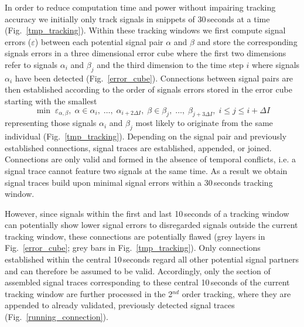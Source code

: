 \documentclass[11pt,pdftex]{article}
\newcommand{\fref}[1]{\textup{\ref{#1}}}
\newcommand{\fig}{Fig.}
\newcommand{\figref}[1]{\fig~\fref{#1}}
\begin{document}
In order to reduce computation time and power without impairing tracking accuracy we initially only track signals in snippets of 30\,seconds at a time (\figref{tmp_tracking}). Within these tracking windows we first compute signal errors ($\varepsilon$) between each potential signal pair $\alpha$ and $\beta$ and store the corresponding signals errors in a three dimensional error cube where the first two dimensions refer to signals $\alpha_i$ and $\beta_j$ and the third dimension to the time step $i$ where signals $\alpha_i$ have been detected (\figref{error_cube}). Connections between signal pairs are then established according to the order of signals errors stored in the error cube starting with the smallest 
\begin{equation}\label{min_e_signal_connect}
  \min \; \varepsilon_{\alpha, \beta}, \; \alpha \in \alpha_i,\;\dots,\;\alpha_{i + 2\Delta I}, \; \beta \in \beta_j,\;\dots,\;\beta_{j + 3\Delta I}, \; i \leq j \leq i + \Delta I  
\end{equation}
representing those signals $\alpha_i$ and $\beta_j$ most likely to originate from the same individual (\figref{tmp_tracking}). Depending on the signal pair and previously established connections, signal traces are established, appended, or joined. Connections are only valid and formed in the absence of temporal conflicts, i.e. a signal trace cannot feature two signals at the same time. As a result we obtain signal traces build upon minimal signal errors within a 30\,seconds tracking window. 

However, since signals within the first and last 10\,seconds of a tracking window can potentially show lower signal errors to disregarded signals outside the current tracking window, these connections are potentially flawed (grey layers in \figref{error_cube}; grey bars in \figref{tmp_tracking}). Only connections established within the central 10\,seconds regard all other potential signal partners and can therefore be assumed to be valid. Accordingly, only the section of assembled signal traces corresponding to these central 10\,seconds of the current tracking window are further processed in the 2$^{nd}$ order tracking, where they are appended to already validated, previously detected signal traces (\figref{running_connection}). 
\end{document}
